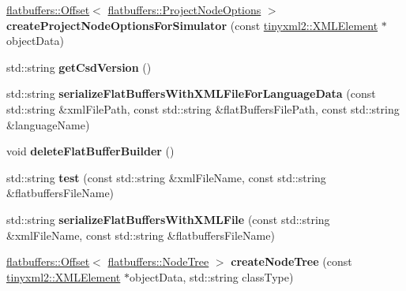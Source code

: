\begin{DoxyCompactItemize}
\hyperlink{structflatbuffers_1_1Offset}{flatbuffers\+::\+Offset}$<$ \hyperlink{structflatbuffers_1_1ProjectNodeOptions}{flatbuffers\+::\+Project\+Node\+Options} $>$ {\bfseries create\+Project\+Node\+Options\+For\+Simulator} (const \hyperlink{classtinyxml2_1_1XMLElement}{tinyxml2\+::\+X\+M\+L\+Element} $\ast$object\+Data)
\item 
\mbox{\label{classcocostudio_1_1FlatBuffersSerialize_a110fd8a70a750c02faba8a703ebf5dbc}} 
std\+::string {\bfseries get\+Csd\+Version} ()
\item 
\mbox{\label{classcocostudio_1_1FlatBuffersSerialize_affeee23693903480f08033deb0b2c480}} 
std\+::string {\bfseries serialize\+Flat\+Buffers\+With\+X\+M\+L\+File\+For\+Language\+Data} (const std\+::string \&xml\+File\+Path, const std\+::string \&flat\+Buffers\+File\+Path, const std\+::string \&language\+Name)
\item 
\mbox{\label{classcocostudio_1_1FlatBuffersSerialize_aa6bc2091bd7c2b5c388d763331cca338}} 
void {\bfseries delete\+Flat\+Buffer\+Builder} ()
\item 
\mbox{\label{classcocostudio_1_1FlatBuffersSerialize_a3b3746930bbf5a337fa63b878880de56}} 
std\+::string {\bfseries test} (const std\+::string \&xml\+File\+Name, const std\+::string \&flatbuffers\+File\+Name)
\item 
\mbox{\label{classcocostudio_1_1FlatBuffersSerialize_ae10fbe2e93c37aa80f399138ccf39b63}} 
std\+::string {\bfseries serialize\+Flat\+Buffers\+With\+X\+M\+L\+File} (const std\+::string \&xml\+File\+Name, const std\+::string \&flatbuffers\+File\+Name)
\item 
\mbox{\label{classcocostudio_1_1FlatBuffersSerialize_a9d6d774a782d586bb60924952b3af7c0}} 
\hyperlink{structflatbuffers_1_1Offset}{flatbuffers\+::\+Offset}$<$ \hyperlink{structflatbuffers_1_1NodeTree}{flatbuffers\+::\+Node\+Tree} $>$ {\bfseries create\+Node\+Tree} (const \hyperlink{classtinyxml2_1_1XMLElement}{tinyxml2\+::\+X\+M\+L\+Element} $\ast$object\+Data, std\+::string class\+Type)
\item 

\end{DoxyCompactItemize}
